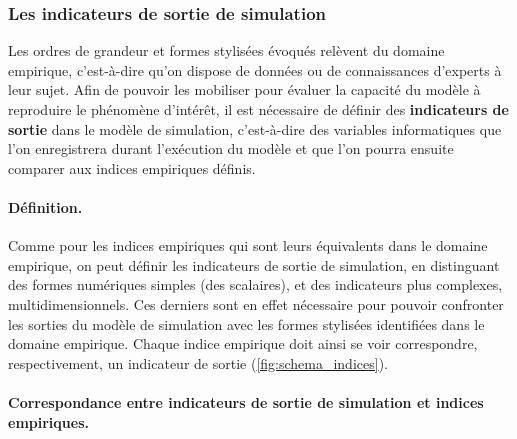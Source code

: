 
\subsubsection{Les indicateurs de sortie de simulation}


Les ordres de grandeur et formes stylisées évoqués relèvent du domaine empirique, c'est-à-dire qu'on dispose de données ou de connaissances d'experts à leur sujet.
Afin de pouvoir les mobiliser pour évaluer la capacité du modèle à reproduire le phénomène d'intérêt, il est nécessaire de définir des \textbf{indicateurs de sortie} dans le modèle de simulation, c'est-à-dire des variables informatiques que l'on enregistrera durant l'exécution du modèle et que l'on pourra ensuite comparer aux indices empiriques définis.


\paragraph{Définition.}
Comme pour les indices empiriques qui sont leurs équivalents dans le domaine empirique, on peut définir les indicateurs de sortie de simulation, en distinguant des formes numériques simples (des scalaires), et des indicateurs plus complexes, multidimensionnels.
Ces derniers sont en effet nécessaire pour pouvoir confronter les sorties du modèle de simulation avec les formes stylisées identifiées dans le domaine empirique.
Chaque indice empirique doit ainsi se voir correspondre, respectivement, un indicateur de sortie (\cref{fig:schema_indices}).

\paragraph{Correspondance entre indicateurs de sortie de simulation et indices empiriques.}\label{par:correspondance}

